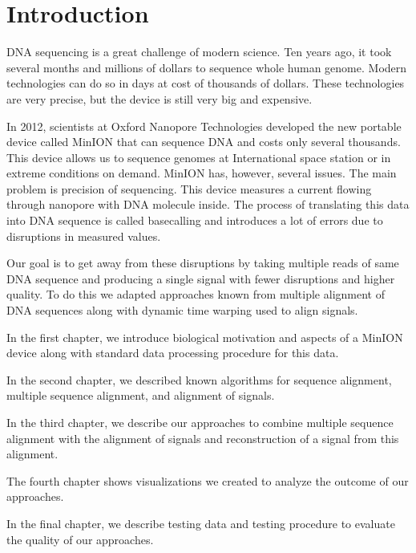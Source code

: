 \chapter*{Introduction} %

DNA sequencing is a great challenge of modern science. 
Ten years ago, it took several months and millions of dollars to sequence whole human genome. 
Modern technologies can do so in days at cost of thousands of dollars.
These technologies are very precise, but the device is still very 
big and expensive.


In 2012, scientists at Oxford Nanopore Technologies developed the new portable device called MinION
that can sequence DNA and costs only several thousands. 
This device allows us to sequence genomes at International space station or in extreme conditions on demand. 
MinION has, however, several issues. The main problem is precision of sequencing. This device measures a current flowing through nanopore with DNA molecule inside. The process of translating this data into DNA sequence is called basecalling and introduces a 
lot of errors due to disruptions in measured values. 

Our goal is 
to get away from these disruptions by taking multiple reads of same 
DNA sequence and producing a single signal with fewer disruptions 
and higher quality. To do this we adapted approaches known from 
multiple alignment of DNA sequences along with dynamic time warping used to align signals.

In the first chapter, we introduce biological motivation and aspects 
of a MinION device along with standard data processing procedure for this data.

In the second chapter, we described known algorithms 
for sequence alignment, multiple sequence alignment, and alignment of signals.

In the third chapter, we describe our approaches to combine multiple 
sequence alignment with the alignment of signals and reconstruction of 
a signal from this alignment.

The fourth chapter shows visualizations we created to analyze the outcome of our approaches.

In the final chapter, we describe testing data and testing procedure to evaluate the quality of our approaches.